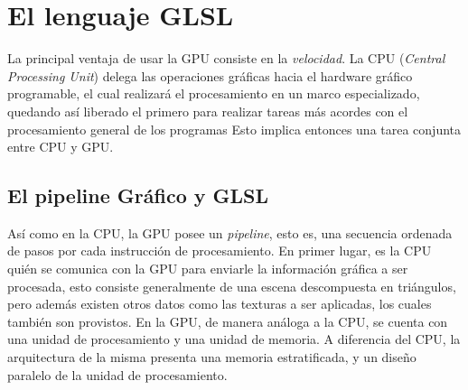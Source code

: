 
\section{El lenguaje GLSL}

La principal ventaja de usar la GPU consiste en la {\em velocidad}. La CPU ({\em Central Processing Unit}) delega las operaciones gr\'aficas hacia el hardware gr\'afico programable, el cual realizar\'a el procesamiento en un marco especializado, quedando as\'i liberado el primero para realizar tareas m\'as acordes con el procesamiento general de los programas
Esto implica entonces una tarea conjunta entre CPU y GPU.


\subsection{El pipeline Gr\'afico y GLSL}
As\'i como en la CPU, la GPU posee un {\em pipeline}, esto es, una secuencia ordenada de pasos por cada instrucci\'on de procesamiento.
En primer lugar, es la CPU quién se comunica con la GPU para enviarle la información gráfica a ser procesada, esto consiste generalmente de una escena descompuesta en triángulos, pero además existen otros datos como las texturas a ser aplicadas, los cuales también son provistos.
En la GPU, de manera análoga a la CPU, se cuenta con una unidad de procesamiento y una unidad de memoria.
A diferencia del CPU, la arquitectura de la misma presenta una memoria estratificada, y un diseño paralelo de la unidad de procesamiento.

